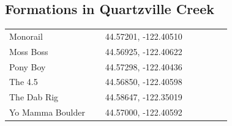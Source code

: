 \begin{flushleft}
\subsection{Formations in Quartzville Creek}
\begin{center}
\begin{supertabular}{p{0.38\linewidth}p{0.5\linewidth}}
Monorail & 44.57201, -122.40510 \\
Moss Boss & 44.56925, -122.40622 \\
Pony Boy & 44.57298, -122.40436 \\
The 4.5 & 44.56850, -122.40598 \\
The Dab Rig & 44.58647, -122.35019 \\
Yo Mamma Boulder & 44.57000, -122.40592 \\
\end{supertabular}
\end{center}

\end{flushleft}
